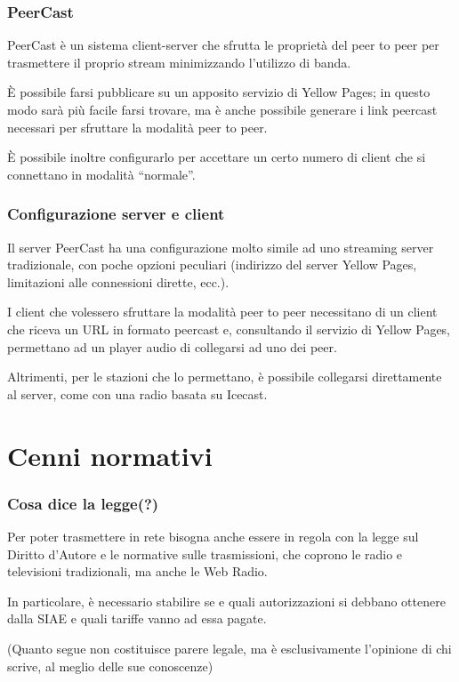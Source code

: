 \documentclass{beamer}
\begin{document}
\begin{frame}\frametitle{PeerCast}
PeerCast è un sistema client-server che sfrutta le proprietà del peer
to peer per trasmettere il proprio stream minimizzando l'utilizzo di
banda.

È possibile farsi pubblicare su un apposito servizio di Yellow Pages;
in questo modo sarà più facile farsi trovare, ma è anche possibile
generare i link peercast necessari per sfruttare la modalità peer to
peer.

È possibile inoltre configurarlo per accettare un certo numero di
client che si connettano in modalità ``normale''.
\end{frame}

\begin{frame}\frametitle{Configurazione server e client}
Il server PeerCast ha una configurazione molto simile ad uno streaming
server tradizionale, con poche opzioni peculiari (indirizzo del server
Yellow Pages, limitazioni alle connessioni dirette, ecc.).

I client che volessero sfruttare la modalità peer to peer necessitano
di un client che riceva un URL in formato peercast e, consultando il
servizio di Yellow Pages, permettano ad un player audio di collegarsi
ad uno dei peer.

Altrimenti, per le stazioni che lo permettano, è possibile collegarsi
direttamente al server, come con una radio basata su Icecast.
\end{frame}

\section{Cenni normativi}

\begin{frame}\frametitle{Cosa dice la legge(?)}
Per poter trasmettere in rete bisogna anche essere in regola con la
legge sul Diritto d'Autore e le normative sulle trasmissioni, che
coprono le radio e televisioni tradizionali, ma anche le Web Radio.

In particolare, è necessario stabilire se e quali autorizzazioni si
debbano ottenere dalla SIAE e quali tariffe vanno ad essa pagate.

(Quanto segue non costituisce parere legale, ma è esclusivamente
l'opinione di chi scrive, al meglio delle sue conoscenze)
\end{frame}
\end{document}
